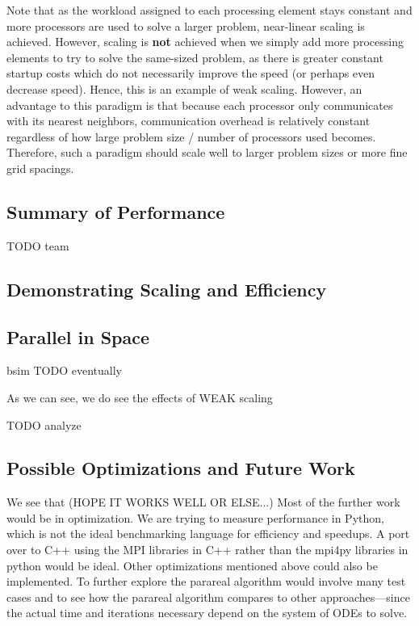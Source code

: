 \documentclass[letterpaper,12pt]{article}
\begin{document}
Note that as the workload assigned to each processing element stays constant and more processors are used to solve a larger problem, near-linear scaling is achieved. However, scaling is \textbf{not} achieved when we simply add more processing elements to try to solve the same-sized problem, as there is greater constant startup costs which do not necessarily improve the speed (or perhaps even decrease speed). Hence, this is an example of weak scaling. However, an advantage to this paradigm is that because each processor only communicates with its nearest neighbors, communication overhead is relatively constant regardless of how large problem size / number of processors used becomes. Therefore, such a paradigm should scale well to larger problem sizes or more fine grid spacings. 


\subsection{Summary of Performance}

TODO team

\subsection{Demonstrating Scaling and Efficiency}

\subsection{Parallel in Space}

bsim TODO eventually

As we can see, we do see the effects of WEAK scaling

TODO analyze

\subsection{Possible Optimizations and Future Work}

We see that (HOPE IT WORKS WELL OR ELSE...) Most of the further work would be in
optimization. We are trying to measure performance in Python, which is not the
ideal benchmarking language for efficiency and speedups. A port over to C++
using the MPI libraries in C++ rather than the mpi4py libraries in python would
be ideal. Other optimizations mentioned above could also be implemented. To
further explore the parareal algorithm would involve many test cases and to see
how the parareal algorithm compares to other approaches---since the actual time
and iterations necessary depend on the system of ODEs to solve.
\end{document}
